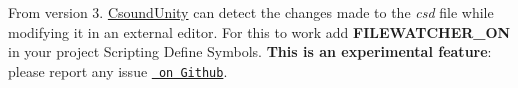 From version 3. \mbox{\hyperlink{class_csound_unity}{Csound\+Unity}} can detect the changes made to the {\itshape csd} file while modifying it in an external editor. For this to work add {\bfseries{FILEWATCHER\+\_\+\+ON}} in your project Scripting Define Symbols. {\bfseries{This is an experimental feature}}\+: please report any issue \href{https://github.com/rorywalsh/CsoundUnity/issues}{\texttt{ on Github}}. 